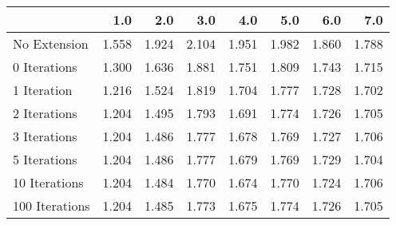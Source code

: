 \begin{tabular}{lrrrrrrr}
\toprule
{} &   1.0 &   2.0 &   3.0 &   4.0 &   5.0 &   6.0 &   7.0 \\
\midrule
No Extension   & 1.558 & 1.924 & 2.104 & 1.951 & 1.982 & 1.860 & 1.788 \\
0 Iterations   & 1.300 & 1.636 & 1.881 & 1.751 & 1.809 & 1.743 & 1.715 \\
1 Iteration    & 1.216 & 1.524 & 1.819 & 1.704 & 1.777 & 1.728 & 1.702 \\
2 Iterations   & 1.204 & 1.495 & 1.793 & 1.691 & 1.774 & 1.726 & 1.705 \\
3 Iterations   & 1.204 & 1.486 & 1.777 & 1.678 & 1.769 & 1.727 & 1.706 \\
5 Iterations   & 1.204 & 1.486 & 1.777 & 1.679 & 1.769 & 1.729 & 1.704 \\
10 Iterations  & 1.204 & 1.484 & 1.770 & 1.674 & 1.770 & 1.724 & 1.706 \\
100 Iterations & 1.204 & 1.485 & 1.773 & 1.675 & 1.774 & 1.726 & 1.705 \\
\bottomrule
\end{tabular}
